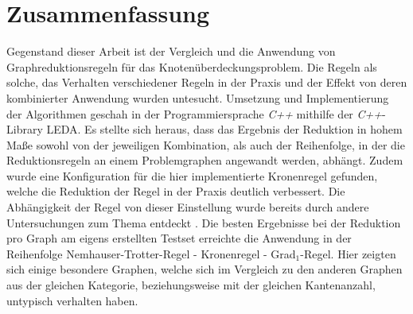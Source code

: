 \chapter*{Zusammenfassung}
Gegenstand dieser Arbeit ist der Vergleich und die Anwendung von Graphreduktionsregeln für das Knotenüberdeckungsproblem. Die Regeln als solche, das Verhalten verschiedener Regeln in der Praxis und der Effekt von deren kombinierter Anwendung wurden untesucht. Umsetzung und Implementierung der Algorithmen geschah in der Programmiersprache \emph{C++} mithilfe der \emph{C++}-Library LEDA. Es stellte sich heraus, dass das Ergebnis der Reduktion in hohem Maße sowohl von der jeweiligen Kombination, als auch der Reihenfolge, in der die Reduktionsregeln an einem Problemgraphen angewandt werden, abhängt. Zudem wurde eine Konfiguration für die hier implementierte Kronenregel gefunden, welche die Reduktion der Regel in der Praxis deutlich verbessert. Die Abhängigkeit der Regel von dieser Einstellung wurde bereits durch andere Untersuchungen zum Thema entdeckt \cite{paper:7}. Die besten Ergebnisse bei der Reduktion pro Graph am eigens erstellten Testset erreichte die Anwendung in der Reihenfolge Nemhauser-Trotter-Regel - Kronenregel - Grad$_{1}$-Regel. Hier zeigten sich einige besondere Graphen, welche sich im Vergleich zu den anderen Graphen aus der gleichen Kategorie, beziehungsweise mit der gleichen Kantenanzahl, untypisch verhalten haben. 